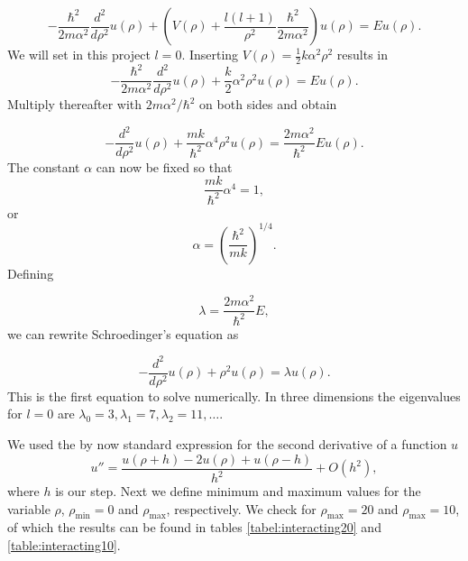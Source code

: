 \documentclass[10pt,showpacs,preprintnumbers,footinbib,amsmath,amssymb,aps,prl,twocolumn,groupedaddress,superscriptaddress,showkeys]{revtex4-1}
\begin{document}
\begin{equation*}
  -\frac{\hbar^2}{2 m \alpha^2} \frac{d^2}{d\rho^2} u(\rho) 
       + \left ( V(\rho) + \frac{l (l + 1)}{\rho^2}
         \frac{\hbar^2}{2 m\alpha^2} \right ) u(\rho)  = E u(\rho) .
\end{equation*}
% 
We will set in this project $l=0$. Inserting $V(\rho) = \frac{1}{2} k \alpha^2\rho^2$ results in
\begin{equation*}
  -\frac{\hbar^2}{2 m \alpha^2} \frac{d^2}{d\rho^2} u(\rho) 
       + \frac{k}{2} \alpha^2\rho^2u(\rho)  = E u(\rho) .
\end{equation*}
Multiply thereafter with $2m\alpha^2/\hbar^2$ on both sides and obtain

\begin{equation*}
  -\frac{d^2}{d\rho^2} u(\rho) 
       + \frac{mk}{\hbar^2} \alpha^4\rho^2u(\rho)  = \frac{2m\alpha^2}{\hbar^2}E u(\rho) .
\end{equation*}
The constant $\alpha$ can now be fixed so that
\begin{equation*}
\frac{mk}{\hbar^2} \alpha^4 = 1,
\end{equation*}
or
\begin{equation*}
\alpha = \left(\frac{\hbar^2}{mk}\right)^{1/4}.
\end{equation*}
Defining

\begin{equation*}
\lambda = \frac{2m\alpha^2}{\hbar^2}E,
\end{equation*}
we can rewrite Schroedinger's equation as

\begin{equation*}
  -\frac{d^2}{d\rho^2} u(\rho) + \rho^2u(\rho)  = \lambda u(\rho) .
\end{equation*}
This is the first equation to solve numerically. In three dimensions 
the eigenvalues for $l=0$ are 
$\lambda_0=3,\lambda_1=7,\lambda_2=11,\dots .$

We used the by now standard
expression for the second derivative of a function $u$
\begin{equation}
    u''=\frac{u(\rho+h) -2u(\rho) +u(\rho-h)}{h^2} +O(h^2),
    \label{eq:diffoperation}
\end{equation}
where $h$ is our step.
Next we define minimum and maximum values for the variable $\rho$,
$\rho_{\mathrm{min}}=0$  and $\rho_{\mathrm{max}}$, respectively.
We check for $\rho_{\mathrm{max}} = 20$ and $\rho_{\mathrm{max}} = 10$, of which the results can be found in tables \ref{tabel:interacting20} and \ref{table:interacting10}.
\end{document}
